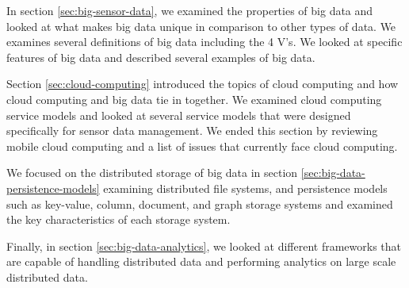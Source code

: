 \documentclass[]{article}
\begin{document}
In section \ref{sec:big-sensor-data}, we examined the properties of big data and looked at what makes big data unique in comparison to other types of data. We examines several definitions of big data including the 4 V's. We looked at specific features of big data and described several examples of big data.

Section \ref{sec:cloud-computing} introduced the topics of cloud computing and how cloud computing and big data tie in together. We examined cloud computing service models and looked at several service models that were designed specifically for sensor data management. We ended this section by reviewing mobile cloud computing and a list of issues that currently face cloud computing.

We focused on the distributed storage of big data in section \ref{sec:big-data-persistence-models} examining distributed file systems, and persistence models such as key-value, column, document, and graph storage systems and examined the key characteristics of each storage system.

Finally, in section \ref{sec:big-data-analytics}, we looked at different frameworks that are capable of handling distributed data and performing analytics on large scale distributed data.



\end{document}
